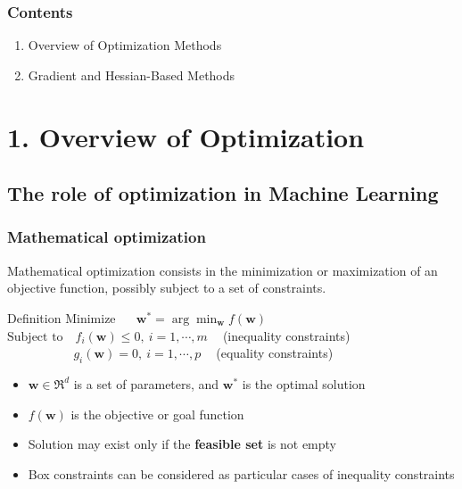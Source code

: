 \documentclass{beamer}
\newcommand{\w}{{\mathbf w}}
\begin{document}
\begin{frame}

    \frametitle{Contents}


\Large



    \begin{enumerate}
  
    	\item Overview of Optimization Methods
    	\item Gradient and Hessian-Based Methods
    \end{enumerate}
    

\end{frame}


\section{1. Overview of Optimization}
\subsection{The role of optimization in Machine Learning}

\begin{frame}

	\frametitle{Mathematical optimization}
	
	Mathematical optimization consists in the minimization or maximization of an objective function, possibly subject to a set of constraints.
	
	\begin{block}{Definition}
	$\text{Minimize~~~~~}{\w}^\ast= \arg\min_\w f(\w)$\\
	$\text{Subject to~~~} f_i(\w) \leq 0, ~i=1,\cdots,m~~~~$ (inequality constraints)\\
	$\text{~~~~~~~~~~~~~~~~} g_i(\w) = 0, ~i=1,\cdots,p~~~~$ (equality constraints)
	
	\end{block}

	\begin{itemize}
		\item $\w \in \Re^d$ is a set of parameters, and $\w^\ast$ is the optimal solution 
		\item $f(\w)$ is the objective or goal function
		\item Solution may exist only if the {\bf feasible set} is not empty
		\item Box constraints can be considered as particular cases of inequality constraints
	\end{itemize}

\end{frame}
\end{document}
